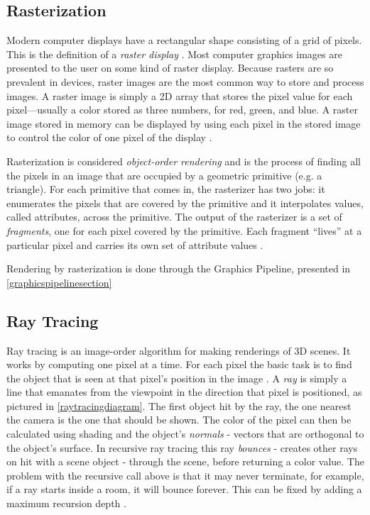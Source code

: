 \documentclass[cic,tc,english]{iiufrgs}
\begin{document}
\subsection{Rasterization}
Modern computer displays have a rectangular shape consisting of a grid of pixels. This is the definition of a \textit{raster display} \cite{Marschner2021CGFundamentals}. Most computer graphics images are presented to the user on some kind of raster display. Because rasters are so prevalent in devices, raster images are the most common way to store and process images. A raster image is simply a 2D array that stores the pixel value for each pixel—usually a color stored as three numbers, for red, green, and blue. A raster image stored in memory can be displayed by using each pixel in the stored image to control the color of one pixel of the display  \cite{Marschner2021CGFundamentals}.

Rasterization is considered \textit{object-order rendering} and is the process of finding all the pixels in an image that are occupied by a geometric primitive (e.g. a triangle). For each primitive that comes in, the rasterizer has two jobs: it enumerates the pixels that are covered by the primitive and it interpolates values, called attributes, across the primitive. The output of the rasterizer is a set of \textit{fragments}, one for each pixel covered by the primitive. Each fragment “lives” at a particular pixel and carries its own set of attribute values \cite{Marschner2021CGFundamentals}.

Rendering by rasterization is done through the Graphics Pipeline, presented in  \cref{graphicspipelinesection}

\subsection{Ray Tracing}
\label{raytracingsection}
Ray tracing is an image-order algorithm for making renderings of 3D scenes. It works by computing one pixel at a time. For each pixel the basic task is to find the object that is seen at that pixel’s position in the image \cite{Marschner2021CGFundamentals}. A \textit{ray} is simply a line that emanates from the viewpoint in the direction that pixel is positioned, as pictured in \cref{raytracingdiagram}. The first object hit by the ray, the one nearest the camera is the one that should be shown. The color of the pixel can then be calculated using shading and the object's \textit{normals} - vectors that are orthogonal to the object's surface. In recursive ray tracing this ray \textit{bounces} - creates other rays on hit with a scene object - through the scene, before returning a color value. The problem with the recursive call above is that it may never terminate, for example, if a ray starts inside a room, it will bounce forever. This can be fixed by adding a maximum recursion depth \cite{Marschner2021CGFundamentals}.
\end{document}
